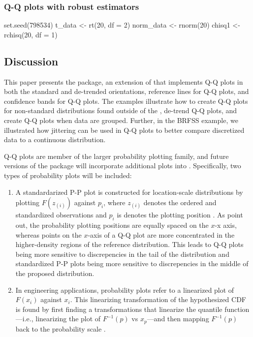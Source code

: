 \subsubsection{Q-Q plots with robust
estimators}\label{q-q-plots-with-robust-estimators}


\begin{Schunk}
\begin{Sinput}
set.seed(798534)
t_data <- rt(20, df = 2)
norm_data <- rnorm(20)
chisq1 <- rchisq(20, df = 1)
\end{Sinput}
\end{Schunk}

\subsection{Discussion}\label{discussion}

This paper presents the  package, an extension of
 that implements Q-Q plots in both the standard and
de-trended orientations, reference lines for Q-Q plots, and confidence
bands for Q-Q plots. The examples illustrate how to create Q-Q plots for
non-standard distributions found outside of the , de-trend
Q-Q plots, and create Q-Q plots when data are grouped. Further, in the
BRFSS example, we illustrated how jittering can be used in Q-Q plots to
better compare discretized data to a continuous distribution.

Q-Q plots are member of the larger probability plotting family, and
future versions of the package will incorporate additional plots into
. Specifically, two types of probability plots will be
included:

\begin{enumerate}
\def\labelenumi{\arabic{enumi}.}
\tightlist
\item
  A standardarized P-P plot is constructed for location-scale
  distributions by plotting \(F(z_{(i)})\) against \(p_i\), where
  \(z_{(i)}\) denotes the ordered and standardized observations and
  \(p_i\) is denotes the plotting position \citep{Gan1991-yk}. As
  \citet{Gan1991-yk} point out, the probability plotting positions are
  equally spaced on the \(x\)-x axis, whereas points on the \(x\)-axis
  of a Q-Q plot are more concentrated in the higher-density regions of
  the reference distribution. This leads to Q-Q plots being more
  sensitive to discrepencies in the tail of the distribution and
  standardized P-P plots being more sensitive to discrepencies in the
  middle of the proposed distribution.
\item
  In engineering applications, probability plots refer to a linearized
  plot of \(F(x_i)\) against \(x_i\). This linearizing transformation of
  the hypothesized CDF is found by first finding a transformations that
  linearize the quantile function---i.e., linearizing the plot of
  \(F^{-1}(p)\) vs \(x_p\)---and then mapping \(F^{-1}(p)\) back to the
  probability scale \citep[cf.][Chapter 6]{Meeker1998}.
\end{enumerate}

